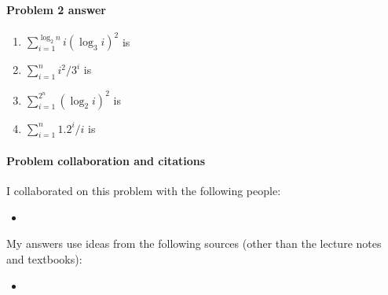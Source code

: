 \paragraph{Problem 2 answer} 

\begin{enumerate}[label=(\alph*)]

\item %
  \(\displaystyle\sum_{i=1}^{\log_2 n} i(\log_3 i)^2\) is
  \BLUE{$\Theta(
    \REPLACEME
    )$}
  
\item %
  $\displaystyle\sum_{i=1}^{n} i^2/3^i$ is
  \BLUE{$\Theta(
    \REPLACEME
    )$}

\item  %
  $\displaystyle\sum_{i=1}^{2^n} (\log_2 i)^2$ is
  \BLUE{$\Theta(
    \REPLACEME
    )$}
  
\item  %
  $\displaystyle\sum_{i=1}^n 1.2^i/i$ is
  \BLUE{$\Theta(
    \REPLACEME
    )$}

\end{enumerate}

\vfill

\paragraph{Problem  collaboration and citations}

I collaborated on this problem with the following people:
\begin{blue}
  \begin{itemize}
  \item \REPLACEME                    %
  \end{itemize}
\end{blue}

My answers use ideas from the following sources (other than the lecture notes and textbooks): 
\begin{blue}
  \begin{itemize}
  \item \REPLACEME                    %
  \end{itemize}
\end{blue}

